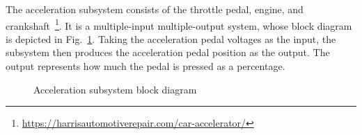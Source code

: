 \documentclass[conference]{IEEEtran}
\begin{document}
  The acceleration subsystem consists of the throttle pedal, engine, and crankshaft~\footnote{\url{https://harrisautomotiverepair.com/car-accelerator/}}. It is a multiple-input multiple-output system, whose block diagram is depicted in Fig.~\ref{fig:accelModelArchitecture}.
Taking the acceleration pedal voltages as the input, the subsystem then produces the acceleration pedal position as the output. The output represents how much the pedal is pressed as a percentage. %
%
 \begin{figure}[htbp]
    \centering
    \caption{Acceleration subsystem block diagram}
    \label{fig:accelModelArchitecture}
 \end{figure}
\end{document}
